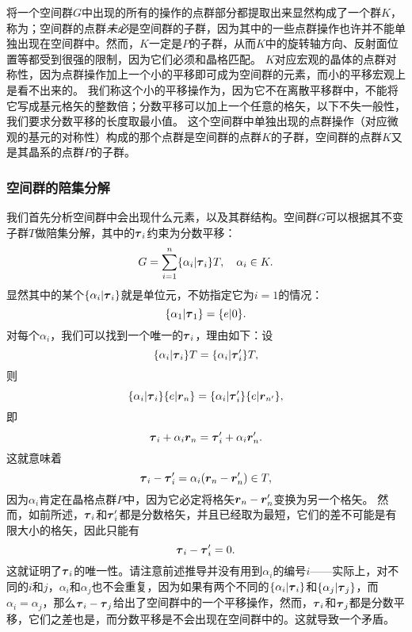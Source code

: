 将一个空间群$G$中出现的所有的操作的点群部分都提取出来显然构成了一个群$K$，称为；空间群的点群\emph{未必}是空间群的子群，因为其中的一些点群操作也许并不能单独出现在空间群中。然而，$K$一定是$P$的子群，从而$K$中的旋转轴方向、反射面位置等都受到很强的限制，因为它们必须和晶格匹配。
$K$对应宏观的晶体的点群对称性，因为点群操作加上一个小的平移即可成为空间群的元素，而小的平移宏观上是看不出来的。
我们称这个小的平移操作为，因为它不在离散平移群中，不能将它写成基元格矢的整数倍；分数平移可以加上一个任意的格矢，以下不失一般性，我们要求分数平移的长度取最小值。
这个空间群中单独出现的点群操作（对应微观的基元的对称性）构成的那个点群是空间群的点群$K$的子群，空间群的点群$K$又是其晶系的点群$P$的子群。

\subsubsection{空间群的陪集分解} 

我们首先分析空间群中会出现什么元素，以及其群结构。空间群$G$可以根据其不变子群$T$做陪集分解，其中的$\vb*{\tau}_i$约束为分数平移：
\begin{equation}
    G = \sum_{i=1}^n \{ \alpha_i | \vb*{\tau}_i \} T, \quad \alpha_i \in K.
    \label{eq:coset-space-group}
\end{equation}
显然其中的某个$\{\alpha_i | \vb*{\tau}_i \}$就是单位元，不妨指定它为$i=1$的情况：
\begin{equation}
    \{\alpha_1 | \vb*{\tau}_1 \} = \{ e | 0 \}.
\end{equation}
对每个$\alpha_i$，我们可以找到一个唯一的$\vb*{\tau}_i$，理由如下：设
\[
    \{\alpha_i | \vb*{\tau}_i \} T = \{ \alpha_i | \vb*{\tau}'_i \} T,
\]
则
\[
    \{\alpha_i | \vb*{\tau}_i \} \{ e | \vb*{r}_n \} = \{\alpha_i | \vb*{\tau}'_i \} \{ e | \vb*{r}_{n'} \},
\]
即
\[
    \vb*{\tau}_i + \alpha_i \vb*{r}_n = \vb*{\tau}_i' + \alpha_i \vb*{r}_n'.
\]
这就意味着
\[
    \vb*{\tau}_i - \vb*{\tau}_i' = \alpha_i (\vb*{r}_n - \vb*{r}_n') \in T,
\]
因为$\alpha_i$肯定在晶格点群$P$中，因为它必定将格矢$\vb*{r}_n - \vb*{r}_n'$变换为另一个格矢。
然而，如前所述，$\vb*{\tau}_i$和$\vb*{\tau}_i'$都是分数格矢，并且已经取为最短，它们的差不可能是有限大小的格矢，因此只能有
\[
    \vb*{\tau}_i - \vb*{\tau}_i' = 0.
\]
这就证明了$\vb*{\tau}_i$的唯一性。请注意前述推导并没有用到$\alpha_i$的编号$i$——实际上，对不同的$i$和$j$，$\alpha_i$和$\alpha_j$也不会重复，因为如果有两个不同的$\{\alpha_i | \vb*{\tau}_i \}$和$\{\alpha_j | \vb*{\tau}_j \}$，而$\alpha_i = \alpha_j$，那么$\vb*{\tau}_i - \vb*{\tau}_j$给出了空间群中的一个平移操作，然而，$\vb*{\tau}_i$和$\vb*{\tau}_j$都是分数平移，它们之差也是，而分数平移是不会出现在空间群中的。这就导致一个矛盾。

